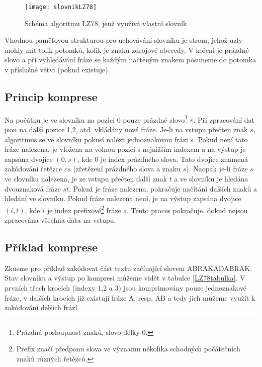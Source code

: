 \begin{figure}[!htb]
\centering
\texttt{[image: slovnikLZ78]}
\caption{Schéma algoritmu LZ78, jenž využívá vlastní slovník}
\label{slovnikLZ78}
\end{figure}

Vhodnou paměťovou strukturou pro uchovávání slovníku je strom, jehož uzly mohly mít tolik potomků, kolik je znaků zdrojové abecedy. V kořeni je prázdné slovo a při vyhledávání fráze se každým načteným znakem posuneme do potomka v příslušné větvi (pokud existuje).

\subsection{Princip komprese}
Na počátku je ve slovníku na pozici 0 pouze prázdné slovo\footnote{Prázdná posloupnost znaků, slovo délky 0.} $\varepsilon$. Při zpracování dat jsou na další pozice 1,2, atd. vkládány nové fráze. Je-li na vstupu přečten znak $s$, algoritmus se ve slovníku pokusí nalézt jednoznakovou frázi $s$. Pokud není tato fráze nalezena, je vložena na volnou pozici s nejnižším indexem a na výstup je zapsána dvojice $(0,s)$, kde 0 je index prázdného slova. Tato dvojice znamená zakódování řetězce $\varepsilon s$ (zřetězení prázdného slova a znaku $s$). Naopak je-li fráze $s$ ve slovníku nalezena, je ze vstupu přečten další znak $t$ a ve slovníku je hledána dvouznaková fráze $st$. Pokud je fráze nalezena, pokračuje načítání dalších znaků a hledání ve slovníku. Pokud fráze nalezena není, je na výstup zapsána dvojice $(i,t)$, kde $i$ je index prefixové\footnote{Prefix značí předponu slova ve významu několika schodných počátečních znaků různých řetězců.} fráze $s$. Tento proces pokračuje, dokud nejsou zpracována všechna data na vstupu.

\subsection{Příklad komprese}
Zkusme pro příklad zakódovat část textu začínající slovem ABRAKADABRAK. Stav slovníku a výstup po kompresi můžeme vidět v tabulce \ref{LZ78tabulka}. V prvních třech krocích (indexy 1,2 a 3) jsou komprimovány pouze jednoznakové fráze, v dalších krocích již existují fráze A, resp. AB a tedy jich můžeme využít k zakódování delších frází.

